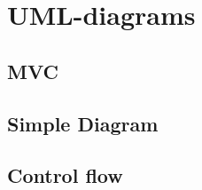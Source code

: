 \chapter{UML-diagrams}
\label{UML}

\section{MVC}
\label{UML-MVC}

\section{Simple Diagram}
\label{UML-SD}

\section{Control flow}
\label{UML-CF}
